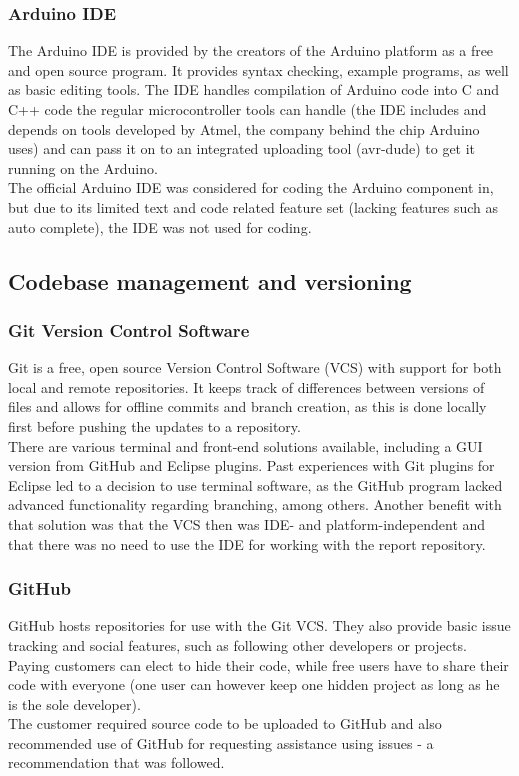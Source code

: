 \subsubsection{Arduino IDE}
The Arduino IDE is provided by the creators of the Arduino platform as a free and open source program. It provides syntax checking, example programs, as well as basic editing tools. The IDE handles compilation of Arduino code into C and C++ code the regular microcontroller tools can handle (the IDE includes and depends on tools developed by Atmel, the company behind the chip Arduino uses) and can pass it on to an integrated uploading tool (avr-dude) to get it running on the Arduino.\\
The official Arduino IDE was considered for coding the Arduino component in, but due to its limited text and code related feature set (lacking features such as auto complete), the IDE was not used for coding.

\subsection{Codebase management and versioning}

\subsubsection{Git Version Control Software}
Git is a free, open source Version Control Software (VCS) with support for both local and remote repositories. It keeps track of differences between versions of files and allows for offline commits and branch creation, as this is done locally first before pushing the updates to a repository.\\
There are various terminal and front-end solutions available, including a GUI version from GitHub and Eclipse plugins. Past experiences with Git plugins for Eclipse led to a decision to use terminal software, as the GitHub program lacked advanced functionality regarding branching, among others. Another benefit with that solution was that the VCS then was IDE- and platform-independent and that there was no need to use the IDE for working with the report repository.
\subsubsection{GitHub}
GitHub hosts repositories for use with the Git VCS. They also provide basic issue tracking and social features, such as following other developers or projects. Paying customers can elect to hide their code, while free users have to share their code with everyone (one user can however keep one hidden project as long as he is the sole developer).\\
The customer required source code to be uploaded to GitHub and also recommended use of GitHub for requesting assistance using issues - a recommendation that was followed.\\

